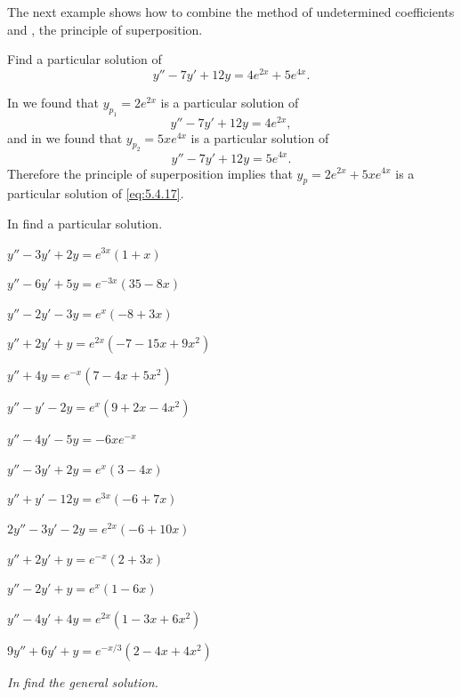 
The next example shows how to combine the method of undetermined
coefficients and , the principle of
superposition.

\begin{example}\label{example:5.4.7}
Find a particular solution of
\begin{equation} \label{eq:5.4.17}
y''-7y'+12y=4e^{2x}+5e^{4x}.
\end{equation}
\end{example}

\begin{solution}
In  we found that $y_{p_1}=2e^{2x}$
is a particular solution of
\[
y''-7y'+12y=4e^{2x},
\]
and in  we found that $y_{p_2}=5xe^{4x}$
is a particular solution of
\[
y''-7y'+12y=5e^{4x}.
\]
Therefore the principle of superposition implies that
$y_p=2e^{2x}+5xe^{4x}$ is a particular solution of \eqref{eq:5.4.17}.
\end{solution}

\exercises
In  find a particular
solution.

\begin{exerciselistTwoColumn}

\item\label{exer:5.4.1}$y''-3y'+2y=e^{3x}(1+x)$
\item\label{exer:5.4.2}$y''-6y'+5y=e^{-3x}(35-8x)$
\item\label{exer:5.4.3}$y''-2y'-3y=e^x(-8+3x)$
\item\label{exer:5.4.4}$y''+2y'+y=e^{2x}(-7-15x+9x^2)$
\item\label{exer:5.4.5}$y''+4y=e^{-x}(7-4x+5x^2)$
\item\label{exer:5.4.6}$y''-y'-2y=e^x(9+2x-4x^2)$
\item\label{exer:5.4.7}$y''-4y'-5y=-6xe^{-x}$
\item\label{exer:5.4.8}$y''-3y'+2y=e^x(3-4x)$
\item\label{exer:5.4.9}$y''+y'-12y=e^{3x}(-6+7x)$
\item\label{exer:5.4.10}$2y''-3y'-2y=e^{2x}(-6+10x)$
\item\label{exer:5.4.11}$y''+2y'+y=e^{-x}(2+3x)$ 
\item\label{exer:5.4.12}$y''-2y'+y=e^x(1-6x)$
\item\label{exer:5.4.13}$y''-4y'+4y=e^{2x}(1-3x+6x^2)$
\item\label{exer:5.4.14}$9y''+6y'+y=e^{-x/3}(2-4x+4x^2)$
\end{exerciselistTwoColumn}
%
\textsl{In  find the general
solution.}

